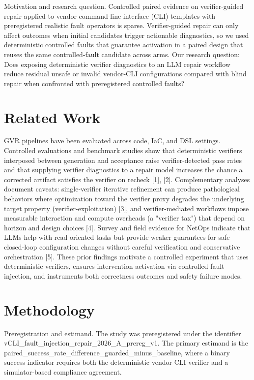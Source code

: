 \documentclass[conference]{IEEEtran}
\begin{document}
Motivation and research question. Controlled paired evidence on verifier-guided repair applied to vendor command-line interface (CLI) templates with preregistered realistic fault operators is sparse. Verifier-guided repair can only affect outcomes when initial candidates trigger actionable diagnostics, so we used deterministic controlled faults that guarantee activation in a paired design that reuses the same controlled-fault candidate across arms. Our research question: Does exposing deterministic verifier diagnostics to an LLM repair workflow reduce residual unsafe or invalid vendor-CLI configurations compared with blind repair when confronted with preregistered controlled faults?

\section{Related Work}
GVR pipelines have been evaluated across code, IaC, and DSL settings. Controlled evaluations and benchmark studies show that deterministic verifiers interposed between generation and acceptance raise verifier-detected pass rates and that supplying verifier diagnostics to a repair model increases the chance a corrected artifact satisfies the verifier on recheck [1], [2]. Complementary analyses document caveats: single-verifier iterative refinement can produce pathological behaviors where optimization toward the verifier proxy degrades the underlying target property (verifier-exploitation) [3], and verifier-mediated workflows impose measurable interaction and compute overheads (a "verifier tax") that depend on horizon and design choices [4]. Survey and field evidence for NetOps indicate that LLMs help with read-oriented tasks but provide weaker guarantees for safe closed-loop configuration changes without careful verification and conservative orchestration [5]. These prior findings motivate a controlled experiment that uses deterministic verifiers, ensures intervention activation via controlled fault injection, and instruments both correctness outcomes and safety failure modes.

\section{Methodology}
Preregistration and estimand. The study was preregistered under the identifier vCLI\_fault\_injection\_repair\_2026\_A\_prereg\_v1. The primary estimand is the paired\_success\_rate\_difference\_guarded\_minus\_baseline, where a binary success indicator requires both the deterministic vendor-CLI verifier and a simulator-based compliance agreement.
\end{document}
